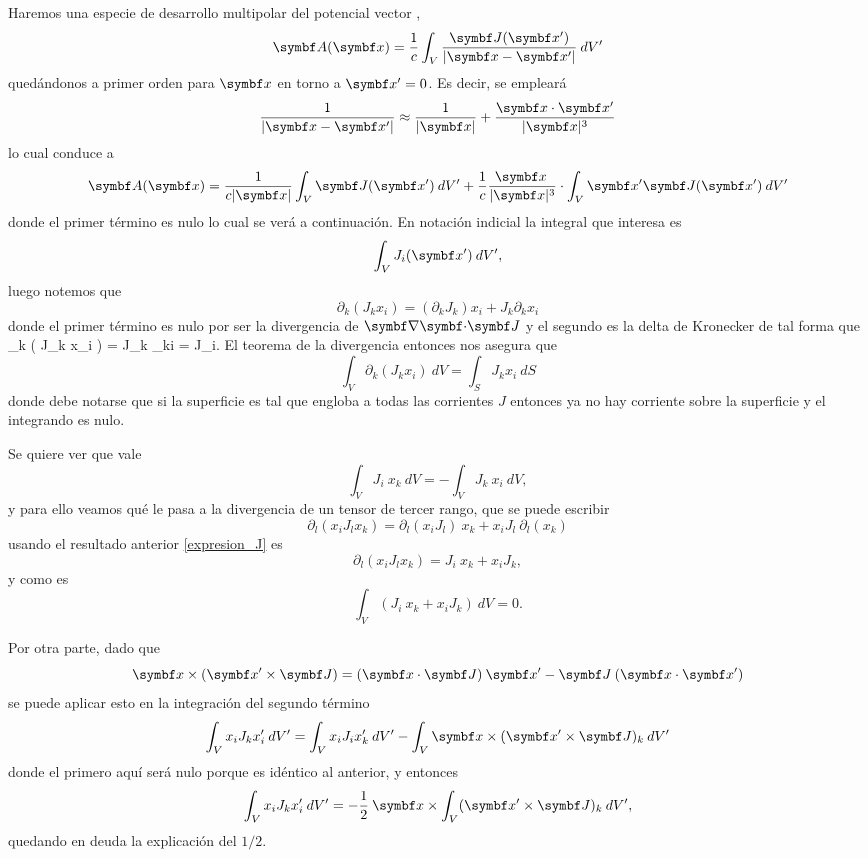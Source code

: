\documentclass[10pt,oneside]{CBFT_book}
\begin{document}
Haremos una especie de desarrollo multipolar del potencial vector ,
\[
	\vb{A}(\vb{x}) = \frac{1}{c} \int_V \frac{\vb{J}(\vb{x}')}{|\vb{x}-\vb{x}'|} \: dV' 
\]
quedándonos a primer orden para $\vbx$ en torno a $\vb{x}'=0$. Es decir, se empleará
\[
	\frac{1}{|\vb{x}-\vb{x}'|} \approx \frac{1}{|\vb{x}|}  + \frac{\vb{x}\cdot\vb{x}'}{|\vb{x}|^3} 
\]
lo cual conduce a
\[
	\vb{A}(\vb{x}) = \frac{1}{c|\vb{x}|} \int_V \vb{J}(\vb{x}') \: dV' 
	+ \frac{1}{c} \frac{ \vb{x} \: }{|\vb{x}|^3} \cdot \int_V \vb{x}' \vb{J}(\vb{x}') \: dV' 
\]
donde el primer término es nulo lo cual se verá a continuación. En notación indicial la integral
que interesa es 
\[
	\int_V J_i (\vb{x}') \: dV',
\]
luego notemos que 
\[
	\partial_k ( J_k x_i ) = ( \partial_k  J_k ) x_i + J_k \partial_k x_i 
\]
donde el primer término es nulo por ser la divergencia de $\divem{J}$ y el segundo es la delta
de Kronecker de tal forma que
\be
	\partial_k ( J_k x_i ) = J_k \delta_{ki} = J_i. 
	\label{expresion_J}
\ee
El teorema de la divergencia entonces nos asegura que
\[
	\int_V \partial_k ( J_k x_i ) \: dV = \int_S J_k x_i \: dS
\]
donde debe notarse que si la superficie es tal que engloba a todas las corrientes $J$ entonces
ya no hay corriente sobre la superficie y el integrando es nulo.

Se quiere ver que vale 
\[
	\int_V J_i \: x_k \: dV = - \int_V J_k \: x_i \: dV,
\]
y para ello veamos qué le pasa a la divergencia de un tensor de tercer rango, que se puede
escribir
\[
	\partial_l( x_i J_l x_k ) =  \partial_l( x_i J_l ) \: x_k + x_i J_l \:\partial_l( x_k )
\]
usando el resultado anterior \eqref{expresion_J} es
\[
	\partial_l( x_i J_l x_k ) = J_i \: x_k + x_i J_k,
\]
y como es
\[
	\int_V (J_i \: x_k + x_i J_k ) \: dV = 0.
\]

Por otra parte, dado que 
\[
	\vbx \times ( \vbx'\times \vb{J}) = (\pe{x}{J})\: \vbx'- \vb{J} \: (\pe{x}{x'} )
\]
se puede aplicar esto en la integración del segundo término
\[
	\int_V x_i J_k x_i' \: dV' = \int_V x_i J_i x_k' \: dV' - \int_V \vbx \times ( \vbx' \times \vb{J} )_k \: dV'
\]
donde el primero aquí será nulo porque es idéntico al anterior, y entonces
\[
	\int_V x_i J_k x_i' \: dV' = - \frac{1}{2} \: \vbx \times \int_V  ( \vbx' \times \vb{J} )_k \: dV',
\]
quedando en deuda la explicación del $1/2$.
\end{document}
